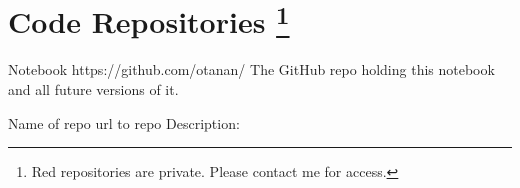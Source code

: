 \chapter*{Code Repositories%
    \footnote{Red repositories are private. Please contact me for access.}
}

\begin{privaterepo} {
    Notebook
} { https://github.com/otanan/ }
    The GitHub repo holding this notebook and all future versions of it.  
\end{privaterepo}

\begin{repo}{
    Name of repo
} { url to repo }
Description:
\end{repo}